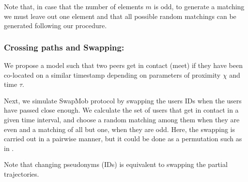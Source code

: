 \documentclass{llncs}
\begin{document}
Note that, in case that the number of elements $m$ is odd, to generate a matching we must leave out one element and that all possible random matchings can be generated following our procedure.

\subsubsection{Crossing paths and Swapping:} \label{sec:cross}
We propose a model such that two peers get in contact (meet) if they have been co-located on a similar timestamp depending on parameters of proximity $\chi$ and time $\tau$.


Next, we simulate SwapMob protocol by swapping the users IDs when the users have passed close enough.
We calculate the set of users that get in contact in a given time interval, and choose a random matching among them when they are even and a matching of all but one, when they are odd.
Here, the swapping is carried out in a pairwise manner, but it could be done as a permutation such as in \cite{Beresford04mixzones}.

Note that changing pseudonyms (IDs) is equivalent to swapping the partial trajectories.


\begin{figure}[!t]
\end{figure}
\end{document}
